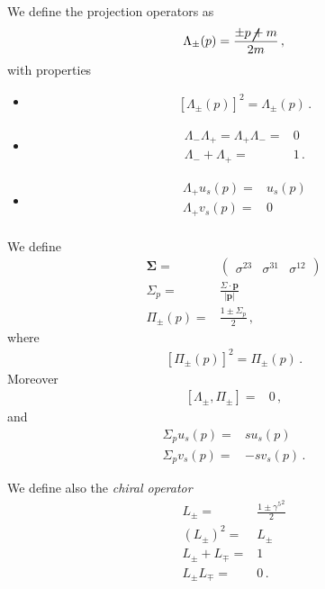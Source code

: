 \begin{frame}
We define the projection operators as
\begin{align*}
  \Lambda_{\pm}(p)=\frac{\pm \cancel{p}+m}{2m}\,,
\end{align*}
with properties
\begin{itemize}
\item 
\begin{align*}
  \left[ \Lambda_{\pm}(p) \right]^2=\Lambda_{\pm}(p)\,.
\end{align*}
\item
  \begin{align*}
    \Lambda_-\Lambda_+=\Lambda_+\Lambda_-=&0 \nonumber\\
    \Lambda_-+\Lambda_+=&1\,.
  \end{align*}
\item
  \begin{align*}
    \Lambda_+ u_s(p)=&u_s(p)\nonumber\\
    \Lambda_+ v_s(p)=&0\nonumber\\
  \end{align*}
\end{itemize}

We define
\begin{align*}
  \boldsymbol{\Sigma}=&
  \begin{pmatrix}
   \sigma^{23}&\sigma^{31}&\sigma^{12} 
  \end{pmatrix}\nonumber\\
  \Sigma_p=&\frac{\Sigma\cdot\mathbf{p}}{|\mathbf{p}|}\nonumber\\
\Pi_{\pm}(p)=&\frac{1\pm\Sigma_{p}}{2}\,,
\end{align*}
where
\begin{align*}
  \left[ \Pi_{\pm}(p) \right]^2=\Pi_{\pm}(p)\,.
\end{align*}
Moreover
\begin{align*}
  \left[ \Lambda_{\pm},\Pi_{\pm} \right]=&0\,,
\end{align*}
and
\begin{align*}
  \Sigma_p u_s(p)=&s u_s(p) \nonumber\\
   \Sigma_p v_s(p)=&-s v_s(p)\,.
\end{align*}

We define also the \emph{chiral operator}
\begin{align*}
  L_{\pm}=&\frac{1\pm {\gamma^{5}}^{2}}{2}\nonumber\\
  \left(L_{\pm}\right)^2=&L_{\pm}\nonumber\\
  L_{\pm}+L_{\mp}=&1 \nonumber\\
  L_{\pm}L_{\mp}=&0\,.
\end{align*}


\end{frame}

